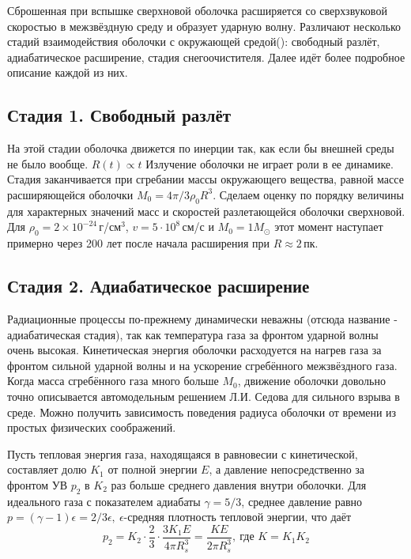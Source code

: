 \documentclass[a4paper,12pt]{extarticle}
\begin{document}
Сброшенная при вспышке сверхновой оболочка расширяется со сверхзвуковой скоростью в межзвёздную среду и образует ударную волну. 
Различают несколько стадий взаимодействия оболочки с окружающей средой({\cite{Spitzer1981}}): свободный разлёт, адиабатическое расширение, стадия снегоочистителя. Далее идёт более подробное описание каждой из них.

\subsection{Стадия 1. Свободный разлёт}
На этой стадии оболочка движется по инерции так, как если бы внешней среды не было вообще. $R(t)\propto t $ 
Излучение оболочки не играет роли в ее динамике. Стадия заканчивается при сгребании массы окружающего вещества, равной массе расширяющейся оболочки $M_0 = 4\pi/3\rho_0R^3$. 
Сделаем оценку по порядку величины для характерных значений масс и скоростей разлетающейся оболочки сверхновой.
Для $\rho_0=2\times10^{-24}$\,г/см$^3$, $v=5\cdot10^8$\,см/с и $M_0=1M_{\odot}$ этот момент наступает примерно через 200 лет после начала расширения при $R\approx 2$\,пк.

\subsection{Стадия 2. Адиабатическое расширение} 
Радиационные процессы по-прежнему динамически неважны (отсюда название - адиабатическая стадия), так как температура газа за фронтом ударной волны очень высокая. Кинетическая энергия оболочки расходуется на нагрев газа за фронтом сильной ударной волны и на ускорение сгребённого межзвёздного газа. Когда масса сгребённого газа много больше $M_0$, движение оболочки довольно точно описывается автомодельным решением Л.И. Седова для сильного взрыва в среде. Можно получить зависимость поведения радиуса оболочки от времени из простых физических соображений.

Пусть тепловая энергия газа, находящаяся в равновесии с кинетической, составляет долю $K_1$ от полной энергии $E$, а давление непосредственно за фронтом УВ $p_2$ в $K_2$ раз больше среднего давления внутри оболочки. Для идеального газа с показателем адиабаты $\gamma=5/3$, среднее давление равно $p=(\gamma-1)\epsilon=2/3\epsilon,\  \epsilon$-средняя плотность тепловой энергии, что даёт 
$$p_2=K_2\cdot \frac{2}{3}\cdot \frac{3K_1E}{4\pi R_s^3}=\frac{KE}{2\pi R_s^3},\ \text{где } K=K_1K_2$$
\end{document}
